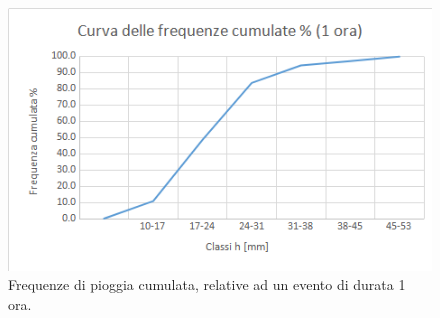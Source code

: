 \begin{figure}[H]\centering
    \includegraphics[scale=.6]{immagini/freq_piogg_cum_1ora.png}
    \caption{Frequenze di pioggia cumulata, relative ad un evento di durata 1 ora.}
  \label{freq_cum_piogg_05ore}
\end{figure}

